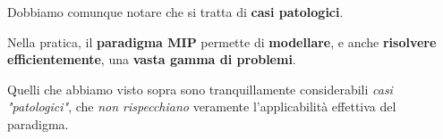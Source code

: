 Dobbiamo comunque notare che si tratta di \textbf{casi patologici}.

\begin{remark}
    Nella pratica, il \textbf{paradigma MIP} permette di 
    \textbf{modellare}, e anche \textbf{risolvere efficientemente}, una
    \textbf{vasta gamma di problemi}.
\end{remark}

Quelli che abbiamo visto sopra sono tranquillamente considerabili
\textit{casi "patologici"}, che \textit{non rispecchiano} veramente
l'applicabilità effettiva del paradigma.
